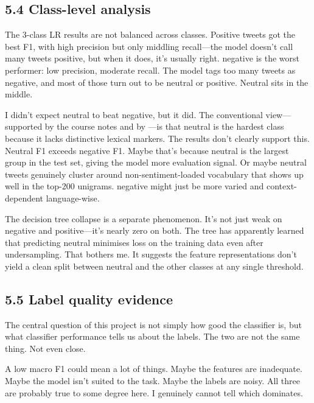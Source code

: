 \documentclass[12pt]{article}
\begin{document}
\subsection*{5.4 Class-level analysis}



The 3-class LR results are not balanced across classes. Positive tweets got the best F1, with high precision but only middling recall---the model doesn't call many tweets positive, but when it does, it's usually right. negative is the worst performer: low precision, moderate recall. The model tags too many tweets as negative, and most of those turn out to be neutral or positive. Neutral sits in the middle.

I didn't expect neutral to beat negative, but it did. The conventional view---supported by the course notes and by \citet{kenyondean2018sentiment}---is that neutral is the hardest class because it lacks distinctive lexical markers. The results don't clearly support this. Neutral F1 exceeds negative F1. Maybe that's because neutral is the largest group in the test set, giving the model more evaluation signal. Or maybe neutral tweets genuinely cluster around non-sentiment-loaded vocabulary that shows up well in the top-200 unigrams. negative might just be more varied and context-dependent language-wise.

The decision tree collapse is a separate phenomenon. It's not just weak on negative and positive---it's nearly zero on both. The tree has apparently learned that predicting neutral minimises loss on the training data even after undersampling. That bothers me. It suggests the feature representations don't yield a clean split between neutral and the other classes at any single threshold.



\subsection*{5.5 Label quality evidence}



The central question of this project is not simply how good the classifier is, but what classifier performance tells us about the labels. The two are not the same thing. Not even close.

A low macro F1 could mean a lot of things. Maybe the features are inadequate. Maybe the model isn't suited to the task. Maybe the labels are noisy. All three are probably true to some degree here. I genuinely cannot tell which dominates.
\end{document}
